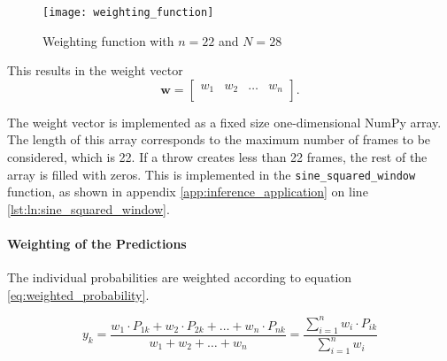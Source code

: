 \begin{figure}
  \centering
  \texttt{[image: weighting\_function]}
  \caption{Weighting function with $n = 22$ and $N = 28$}
  \label{fig:weighting_function}
\end{figure}

This results in the weight vector
\begin{equation}
  \boldsymbol{w} =
  \begin{bmatrix}
    w_{1} & w_{2} & \dots & w_{n} \\
  \end{bmatrix}.
  \label{eq:weight_vector}
\end{equation}

The weight vector is implemented as a fixed size one-dimensional NumPy array. %
The length of this array corresponds to the maximum number of frames to be considered, which is \num{22}.
If a throw creates less than \num{22} frames, the rest of the array is filled with zeros.
This is implemented in the \texttt{sine\_squared\_window} function, as shown in appendix \ref{app:inference_application} on line \ref{lst:ln:sine_squared_window}.

\paragraph{Weighting of the Predictions} %
The individual probabilities are weighted according to equation \ref{eq:weighted_probability}.

\begin{equation}
  y_k = \frac{w_1 \cdot P_{1k} + w_2 \cdot P_{2k} + \dots + w_n \cdot P_{nk}}{w_1 + w_2 + \dots + w_n} = \frac{\sum\limits_{i=1}^{n} w_i \cdot P_{ik}}{\sum\limits_{i=1}^{n} w_i}
  \label{eq:weighted_probability}
\end{equation}

